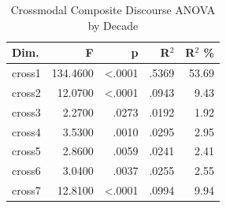 \begin{table}
\caption{Crossmodal Composite Discourse ANOVA by Decade}
\label{tab:crossmodal_composite_anova}
\begin{tabular}{lrrrr}
\toprule
Dim. & F & p & R$^2$ & R$^2$ \% \\
\midrule
cross1 & 134.4600 & <.0001 & .5369 & 53.69 \\
cross2 & 12.0700 & <.0001 & .0943 & 9.43 \\
cross3 & 2.2700 & .0273 & .0192 & 1.92 \\
cross4 & 3.5300 & .0010 & .0295 & 2.95 \\
cross5 & 2.8600 & .0059 & .0241 & 2.41 \\
cross6 & 3.0400 & .0037 & .0255 & 2.55 \\
cross7 & 12.8100 & <.0001 & .0994 & 9.94 \\
\bottomrule
\end{tabular}
\end{table}
